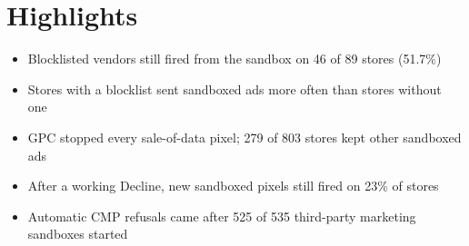 \documentclass[12pt]{article}
\begin{document}
\section*{Highlights}
\begin{itemize}
  \item Blocklisted vendors still fired from the sandbox on 46 of 89 stores (51.7\%)
  \item Stores with a blocklist sent sandboxed ads more often than stores without one
  \item GPC stopped every sale-of-data pixel; 279 of 803 stores kept other sandboxed ads
  \item After a working Decline, new sandboxed pixels still fired on 23\% of stores
  \item Automatic CMP refusals came after 525 of 535 third-party marketing sandboxes started
\end{itemize}
\end{document}
